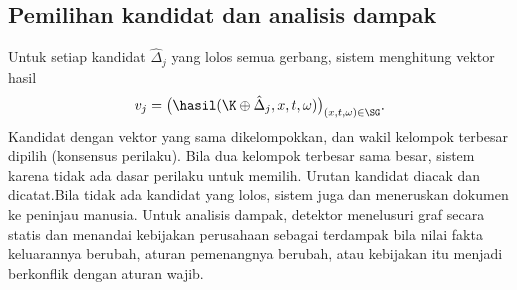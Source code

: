 \subsection{Pemilihan kandidat dan analisis dampak}
Untuk setiap kandidat $\hat{\Delta}_j$ yang lolos semua gerbang, sistem menghitung vektor hasil
\begin{equation}
v_j = \big(\hasil(\K \oplus \hat{\Delta}_j, x, t, \omega)\big)_{(x,t,\omega) \in \SG}.
\label{eq:vektor}
\end{equation}
Kandidat dengan vektor yang sama dikelompokkan, dan wakil kelompok terbesar dipilih (konsensus perilaku). Bila dua kelompok terbesar sama besar, sistem  karena tidak ada dasar perilaku untuk memilih. Urutan kandidat diacak dan dicatat.Bila tidak ada kandidat yang lolos, sistem juga  dan meneruskan dokumen ke peninjau manusia. Untuk analisis dampak, detektor menelusuri graf secara statis dan menandai kebijakan perusahaan sebagai terdampak bila nilai fakta keluarannya berubah, aturan pemenangnya berubah, atau kebijakan itu menjadi berkonflik dengan aturan wajib.

